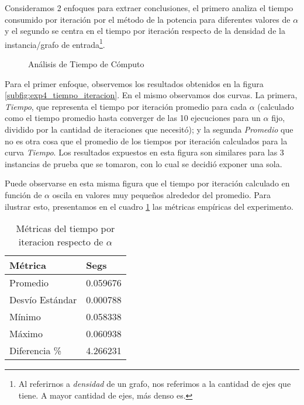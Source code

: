 \par Consideramos 2 enfoques para extraer conclusiones, el primero analiza el
tiempo consumido por iteración por el método de la potencia para diferentes
valores de $\alpha$ y el segundo se centra en el tiempo por iteraci\'on respecto
de la densidad de la instancia/grafo de entrada\footnote{Al referirnos a
\emph{densidad} de un grafo, nos referimos a la cantidad de ejes que tiene. A
mayor cantidad de ejes, m\'as denso es.}.

\begin{figure}[H]
    \centering
    \caption{An\'alisis de Tiempo de C\'omputo}
\end{figure}

\par Para el primer enfoque, observemos los resultados obtenidos en la figura
\ref{subfig:exp4_tiempo_iteracion}. En el mismo observamos dos curvas. La
primera, \emph{Tiempo}, que representa el tiempo por iteraci\'on promedio para
cada $\alpha$ (calculado como el tiempo promedio hasta converger de las 10
ejecuciones para un $\alpha$ fijo, dividido por la cantidad de iteraciones que
necesit\'o); y la segunda \emph{Promedio} que no es otra cosa que el promedio de
los tiempos por iteraci\'on calculados para la curva \emph{Tiempo}. Los
resultados expuestos en esta figura son similares para las 3 instancias de
prueba que se tomaron, con lo cual se decidi\'o exponer una sola.

\par Puede observarse en esta misma figura que el tiempo por iteraci\'on
calculado en funci\'on de $\alpha$ oscila en valores muy pequeños alrededor del
promedio. Para ilustrar esto, presentamos en el cuadro
\ref{tbl:exp4_data_notredame} las m\'etricas empíricas del experimento.

\begin{table}[H]
    \centering
    \caption{Métricas del tiempo por iteracion respecto de $\alpha$}
    \label{tbl:exp4_data_notredame} 
    \setlength{\tabcolsep}{3pt}
    \begin{tabular}{|l|l|}
        \hline
        Métrica & Segs\\
        \hline\hline
        Promedio & 0.059676\\
        Desv\'io Est\'andar & 0.000788\\
        M\'inimo & 0.058338\\
        M\'aximo & 0.060938\\
        Diferencia \%\footnotemark& 4.266231\\
        \hline
    \end{tabular}
\end{table}


